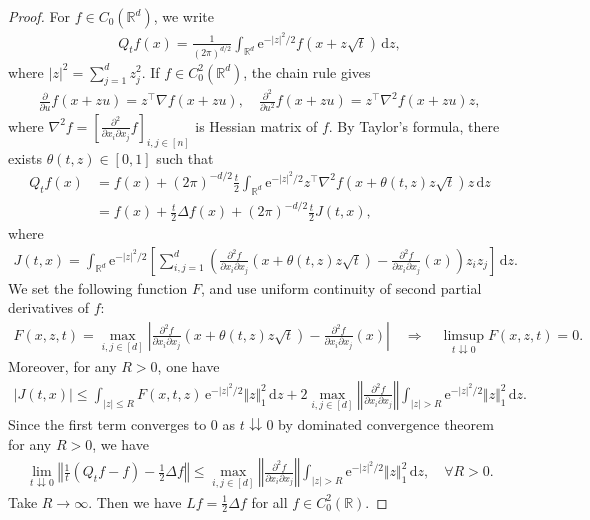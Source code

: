 \documentclass{article}
\numberwithin{equation}{section}
\newcommand{\e}{\mathrm{e}}
\renewcommand{\d}{\mathrm{d}}
\theoremstyle{plain}
\theoremstyle{definition}
\begin{document}
\begin{proof}
For $f\in C_0(\mathbb{R}^d)$, we write
\begin{align*}
	Q_tf(x) = \frac{1}{(2\pi)^{d/2}}\int_{\mathbb{R}^d}\e^{-\vert z\vert^2/2}f(x+z\sqrt{t})\,\d z,\tag{6.7}\label{eq:6.7}
\end{align*}
where $\vert z\vert^2=\sum_{j=1}^d z_j^2$. If $f\in C_0^2(\mathbb{R}^d)$, the chain rule gives
\begin{align*}
	\frac{\partial}{\partial u}f(x+zu)=z^\top\nabla f(x+zu),\quad \frac{\partial^2}{\partial u^2}f(x+zu)=z^\top\nabla^2f(x+zu)z,
\end{align*}
where $\nabla^2f=[\frac{\partial^2}{\partial x_i\partial x_j}f]_{i,j\in[n]}$ is Hessian matrix of $f$. By Taylor's formula, there exists $\theta(t,z)\in[0,1]$ such that
\begin{align*}
	Q_tf(x)&=f(x) + (2\pi)^{-d/2}\frac{t}{2}\int_{\mathbb{R}^d}\e^{-\vert z\vert^2/2}z^\top\nabla^2f(x+\theta(t,z)z\sqrt{t})z\,\d z\\
	&= f(x)+\frac{t}{2}\Delta f(x)+(2\pi)^{-d/2}\frac{t}{2}J(t,x),
\end{align*}
where
\begin{align*}
	J(t,x)=\int_{\mathbb{R}^d}\e^{-\vert z\vert^2/2}\left[\sum_{i,j=1}^d\left(\frac{\partial^2f}{\partial x_i\partial x_j}(x+\theta(t,z) z\sqrt{t})-\frac{\partial^2f}{\partial x_i\partial x_j}(x)\right)z_iz_j\right]\,\d z.
\end{align*}
We set the following function $F$, and use uniform continuity of second partial derivatives of $f$:
\begin{align*}
	F(x,z,t)=\max_{i,j\in[d]}\left\vert \frac{\partial^2f}{\partial x_i\partial x_j}(x+\theta(t,z) z\sqrt{t})-\frac{\partial^2f}{\partial x_i\partial x_j}(x)\right\vert\quad\Rightarrow\quad\limsup_{t\downdownarrows 0}F(x,z,t)=0.
\end{align*}
Moreover, for any $R>0$, one have
\begin{align*}
	\vert J(t,x)\vert\leq\int_{\vert z\vert\leq R}F(x,t,z)\,\e^{-\vert z\vert^2/2}\Vert z\Vert_1^2\,\d z+2\max_{i,j\in[d]}\left\Vert \frac{\partial^2 f}{\partial x_i\partial x_j}\right\Vert\int_{\vert z\vert>R}\e^{-\vert z\vert^2/2}\Vert z\Vert_1^2\,\d z.
\end{align*}
Since the first term converges to $0$ as $t\downdownarrows 0$ by dominated convergence theorem for any $R>0$, we have
\begin{align*}
	\lim_{t\downdownarrows 0}\left\Vert \frac{1}{t}(Q_t f-f)-\frac{1}{2}\Delta f\right\Vert\leq\max_{i,j\in[d]}\left\Vert \frac{\partial^2 f}{\partial x_i\partial x_j}\right\Vert\int_{\vert z\vert>R}\e^{-\vert z\vert^2/2}\Vert z\Vert_1^2\,\d z,\quad\forall R>0.
\end{align*}
Take $R\to\infty$. Then we have $Lf=\frac{1}{2}\Delta f$ for all $f\in C_0^2(\mathbb{R})$.
\end{proof}
\end{document}
